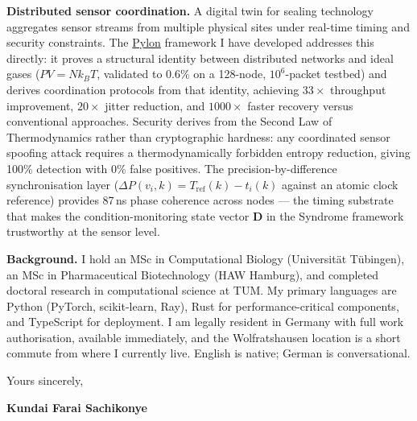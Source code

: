 \documentclass[12pt,a4paper]{article}
\begin{document}
\textbf{Distributed sensor coordination.}
A digital twin for sealing technology aggregates sensor streams from multiple
physical sites under real-time timing and security constraints. The
\href{https://github.com/fullscreen-triangle/pylon}{Pylon} framework I have
developed addresses this directly: it proves a structural identity between
distributed networks and ideal gases ($PV = Nk_BT$, validated to 0.6\%
on a 128-node, $10^6$-packet testbed) and derives coordination protocols
from that identity, achieving $33\times$ throughput improvement, $20\times$
jitter reduction, and $1000\times$ faster recovery versus conventional
approaches. Security derives from the Second Law of Thermodynamics rather
than cryptographic hardness: any coordinated sensor spoofing attack requires
a thermodynamically forbidden entropy reduction, giving 100\% detection with
0\% false positives. The precision-by-difference synchronisation layer
($\Delta P(v_i, k) = T_\mathrm{ref}(k) - t_i(k)$ against an atomic clock
reference) provides 87\,ns phase coherence across nodes --- the timing
substrate that makes the condition-monitoring state vector $\mathbf{D}$
in the Syndrome framework trustworthy at the sensor level.

\textbf{Background.}
I hold an MSc in Computational Biology (Universität Tübingen), an MSc in
Pharmaceutical Biotechnology (HAW Hamburg), and completed doctoral research
in computational science at TUM. My primary languages are Python (PyTorch,
scikit-learn, Ray), Rust for performance-critical components, and TypeScript
for deployment. I am legally resident in Germany with full work authorisation,
available immediately, and the Wolfratshausen location is a short commute
from where I currently live. English is native; German is conversational.

\vspace{1.5em}
Yours sincerely,

\vspace{2.5em}
\textbf{Kundai Farai Sachikonye}
\end{document}
